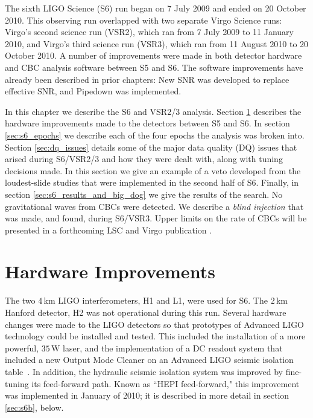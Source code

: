 
\def\firstFAR{\ensuremath{\mathrm{2.2~yr^{-1}}}}
\def\secondFAR{\ensuremath{\mathrm{5.6~yr^{-1}}}}
\def\thirdFAR{\ensuremath{\mathrm{9.4~yr^{-1}}}}
\def\expectedLoudestFAR{\ensuremath{\mathrm{\sim2~yr^{-1}}}}
\def\dogDate{16 September 2010}
\def\injectedDogTime{06:42:23 UTC}
\def\injectedDogGPSTime{968654558.0}

The sixth \ac{LIGO} Science (S6) run began on 7 July 2009 and ended on 20
October 2010. This observing run overlapped with two separate Virgo Science
runs: Virgo's second science run (VSR2), which ran from 7 July 2009 to 11
January 2010, and Virgo's third science run (VSR3), which ran from 11 August
2010 to 20 October 2010. A number of improvements were made in both detector
hardware and \ac{CBC} analysis software between \ac{S5} and \ac{S6}. The
software improvements have already been described in prior chapters: New
\ac{SNR} was developed to replace effective \ac{SNR}, and Pipedown was
implemented.

In this chapter we describe the \ac{S6} and VSR2/3 analysis. Section
\ref{sec:hardware_improvements} describes the hardware improvements made to the
detectors between \ac{S5} and \ac{S6}. In section \ref{sec:s6_epochs} we
describe each of the four epochs the analysis was broken into. Section
\ref{sec:dq_issues} details some of the major data quality (DQ) issues that
arised during S6/VSR2/3 and how they were dealt with, along with tuning
decisions made. In this section we give an example of a veto developed from the
loudest-slide studies that were implemented in the second half of \ac{S6}.
Finally, in section \ref{sec:s6_results_and_big_dog} we give the results of the
search. No gravitational waves from \acp{CBC} were detected. We describe a
\emph{blind injection} that was made, and found, during S6/VSR3.  Upper limits
on the rate of \acp{CBC} will be presented in a forthcoming \ac{LSC} and Virgo
publication \cite{Collaboration:S6CBClowmasss}.

\section{Hardware Improvements}
\label{sec:hardware_improvements}

The two $4\,$km \ac{LIGO} interferometers, H1 and L1, were used for \ac{S6}.
The $2\,$km Hanford detector, H2 was not operational during this run. Several
hardware changes were made to the \ac{LIGO} detectors so that prototypes of
Advanced LIGO technology could be installed and tested. This included the
installation of a more powerful, $35\,\mathrm{W}$ laser, and the implementation
of a DC readout system that included a new Output Mode Cleaner on an Advanced
LIGO seismic isolation table~\cite{Adhikari:2006}. In addition, the hydraulic
seismic isolation system was improved by fine-tuning its feed-forward path.
Known as ``HEPI feed-forward," this improvement was implemented in January of
2010; it is described in more detail in section \ref{sec:s6b}, below.

